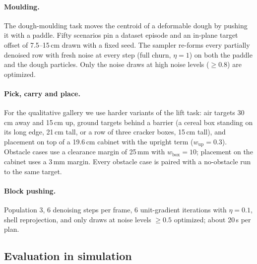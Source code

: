 \paragraph{Moulding.}
The dough-moulding task moves the centroid of a deformable dough by pushing it with a paddle. Fifty scenarios pin a
dataset episode and an in-plane target offset of 7.5--15\,cm drawn with a fixed seed. The sampler re-forms every
partially denoised row with fresh noise at every step (full churn, $\eta = 1$) on both the paddle and the dough
particles. Only the noise draws at high noise levels ($\ge 0.8$) are optimized.

\paragraph{Pick, carry and place.}
For the qualitative gallery we use harder variants of the lift task: air targets 30\,cm away and 15\,cm up, ground
targets behind a barrier (a cereal box standing on its long edge, 21\,cm tall, or a row of three cracker boxes, 15\,cm
tall), and placement on top of a 19.6\,cm cabinet with the upright term ($w_{\text{up}} = 0.3$). Obstacle cases use
a clearance margin of 25\,mm with $w_{\text{box}} = 10$; placement on the cabinet uses a 3\,mm margin. Every obstacle
case is paired with a no-obstacle run to the same target.

\paragraph{Block pushing.}
Population 3, 6 denoising steps per frame, 6 unit-gradient iterations with $\eta = 0.1$, shell reprojection, and only
draws at noise levels $\ge 0.5$ optimized; about 20\,s per plan.

\subsection{Evaluation in simulation}
\label{sec:eval-sim}

